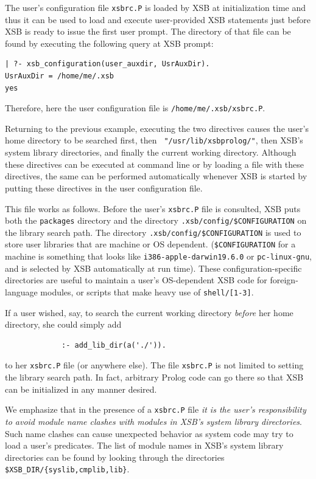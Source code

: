 The user's configuration file  \texttt{xsbrc.P} 
is loaded by XSB at initialization time
and thus it can be used to load and execute user-provided XSB statements
just before XSB is ready to issue the first user prompt.
The directory of that file can be found by executing the following query at
XSB prompt:
\begin{verbatim}
| ?- xsb_configuration(user_auxdir, UsrAuxDir).
UsrAuxDir = /home/me/.xsb
yes
\end{verbatim}
Therefore, here the user configuration file is
\texttt{/home/me/.xsb/xsbrc.P}. 

Returning to the previous example, executing the two directives causes
the user's home directory to be searched first, then {\tt
  "/usr/lib/xsbprolog/"}, then XSB's system library directories, and
finally the current working directory.  Although these directives
can be executed at command line or by loading a file
with these directives, the same can be performed automatically whenever
XSB is started by putting these directives in the user configuration
file.

This file works as follows.  Before the user's {\verb|xsbrc.P|}
file
is consulted, XSB puts both the {\tt packages} directory and the
directory \verb|.xsb/config/$CONFIGURATION| on the library search
path.  The directory \verb'.xsb/config/$CONFIGURATION' is used to
store user libraries that are machine or OS
dependent. (\verb'$CONFIGURATION' for a machine is something that
looks like {\tt i386-apple-darwin19.6.0} or {\tt pc-linux-gnu}, and is
selected by XSB automatically at run time).  These
configuration-specific directories are useful to maintain a user's
OS-dependent XSB code for foreign-language modules, or scripts that
make heavy use of {\tt shell/[1-3]}.

If a user wished, say, to search the current working directory {\em
  before} her home directory, she could simply add
\begin{verbatim}
             :- add_lib_dir(a('./')).
\end{verbatim}
to her {\verb|xsbrc.P|} file (or anywhere else).  The file
{\verb|xsbrc.P|} is not limited to setting the library search
path.  In fact, arbitrary Prolog code can go there so that XSB can be
initialized in any manner desired.

We emphasize that in the presence of a {\verb|xsbrc.P|} file {\em
it is the user's responsibility to avoid module name clashes with
modules in XSB's system library directories}.  Such name clashes can
cause unexpected behavior as system code may try to load a user's
predicates.  The list of module names in XSB's system library
directories can be found by looking through the directories {\tt
\$XSB\_DIR/\{syslib,cmplib,lib\}}.

